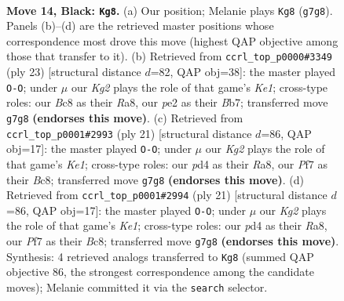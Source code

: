 \documentclass[11pt]{article}
\begin{document}
\begin{figure}[p]
\label{fig:thought-m25}
\end{figure}

\clearpage

\begin{figure}[p]\centering
\begin{subfigure}{0.46\textwidth}\centering
\resizebox{\linewidth}{!}{%
\newchessgame
\chessboard[
  setfen={rnbqr3/p3bpkp/2p1p1p1/1p1n4/3P4/1P1Q1BP1/P2NPP1P/RNB2RK1 b - - 0 14},
  showmover=false,
  pgfstyle=straightmove, color=movearrow, markmove={g7-g8}
]}
\caption{}
\end{subfigure}\hfill
\begin{subfigure}{0.46\textwidth}\centering
\resizebox{\linewidth}{!}{%
\newchessgame
\chessboard[
  setfen={r3k2r/1bqpbppp/p1n1p3/1p1nP3/8/P2Q1NP1/1PPN1PBP/R1B1R1K1 b kq - 2 12},
  showmover=false,
  pgfstyle=straightmove, color=movearrow, markmove={e8-g8}
]}
\caption{}
\end{subfigure}
\\[4pt]
\begin{subfigure}{0.46\textwidth}\centering
\resizebox{\linewidth}{!}{%
\newchessgame
\chessboard[
  setfen={r1bqk2r/1p1nbppp/2p1p3/p7/PnNP4/2Q2NP1/1P2PPBP/R1B2RK1 b kq - 0 11},
  showmover=false,
  pgfstyle=straightmove, color=movearrow, markmove={e8-g8}
]}
\caption{}
\end{subfigure}\hfill
\begin{subfigure}{0.46\textwidth}\centering
\resizebox{\linewidth}{!}{%
\newchessgame
\chessboard[
  setfen={r1bqk2r/1p1nbppp/2p1p3/p7/PnNP4/2Q2NP1/1P2PPBP/R1B2RK1 b kq - 0 11},
  showmover=false,
  pgfstyle=straightmove, color=movearrow, markmove={e8-g8}
]}
\caption{}
\end{subfigure}
\caption{\textbf{Move 14, Black: \texttt{Kg8}.} (a) Our position; Melanie plays \texttt{Kg8} (\texttt{g7g8}). Panels (b)--(d) are the retrieved master positions whose correspondence most drove this move (highest QAP objective among those that transfer to it). (b) Retrieved from \texttt{ccrl\_top\_p0000\#3349} (ply 23) [structural distance $d$=82, QAP obj=38]: the master played \texttt{O-O}; under $\mu$ our \emph{Kg2} plays the role of that game's \emph{Ke1}; cross-type roles: our \emph{B}c8 as their \emph{R}a8, our \emph{p}e2 as their \emph{B}b7; transferred move \texttt{g7g8} \textbf{(endorses this move)}. (c) Retrieved from \texttt{ccrl\_top\_p0001\#2993} (ply 21) [structural distance $d$=86, QAP obj=17]: the master played \texttt{O-O}; under $\mu$ our \emph{Kg2} plays the role of that game's \emph{Ke1}; cross-type roles: our \emph{p}d4 as their \emph{R}a8, our \emph{P}f7 as their \emph{B}c8; transferred move \texttt{g7g8} \textbf{(endorses this move)}. (d) Retrieved from \texttt{ccrl\_top\_p0001\#2994} (ply 21) [structural distance $d$=86, QAP obj=17]: the master played \texttt{O-O}; under $\mu$ our \emph{Kg2} plays the role of that game's \emph{Ke1}; cross-type roles: our \emph{p}d4 as their \emph{R}a8, our \emph{P}f7 as their \emph{B}c8; transferred move \texttt{g7g8} \textbf{(endorses this move)}. Synthesis: 4 retrieved analogs transferred to \texttt{Kg8} (summed QAP objective 86, the strongest correspondence among the candidate moves); Melanie committed it via the \texttt{search} selector.}

\end{figure}
\end{document}
